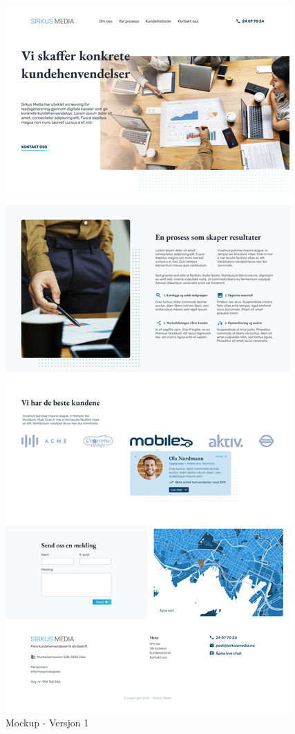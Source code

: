 \begin{figure}[H]
    \centering
    \includegraphics[height=\textheight]{design/mockup1-draft3.png}
    \caption{Mockup - Versjon 1}
    \label{fig:mockup-v1}
\end{figure}

